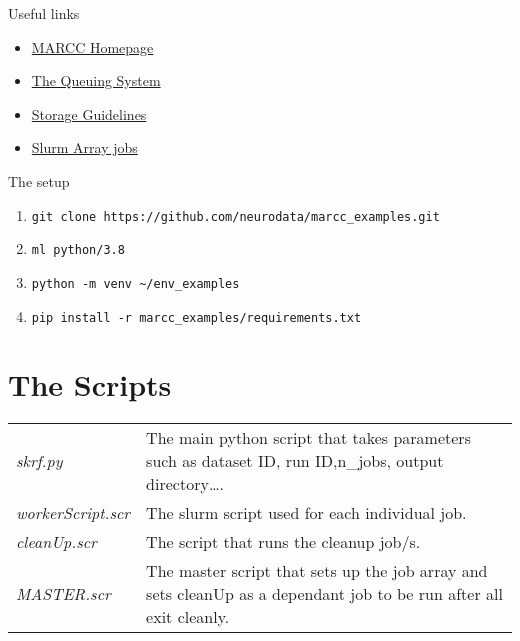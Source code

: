 \documentclass[xcolor=dvipsnames, aspectratio=169]{beamer}
\begin{document}

\begin{frame}{Useful links}
\begin{minipage}[t]{0.3\textwidth}
    \begin{itemize}
        \item \href{https://www.marcc.jhu.edu}{MARCC Homepage}
        \item \href{https://www.marcc.jhu.edu/getting-started/running-jobs/}{The Queuing System}
        \item \href{https://www.marcc.jhu.edu/troubleshoot/storage-guidelines/}{Storage Guidelines}
    \end{itemize}
\end{minipage}
\begin{minipage}[t]{0.3\textwidth}
    \begin{itemize}
        \item \href{https://slurm.schedmd.com/job_array.html}{Slurm Array jobs}
    \end{itemize}
\end{minipage}
\end{frame}

\begin{frame}[fragile]{The setup}
    \begin{enumerate}
        \item \verb;git clone https://github.com/neurodata/marcc_examples.git;
        \item \verb;ml python/3.8;
        \item \verb;python -m venv ~/env_examples;
        \item \verb;pip install -r marcc_examples/requirements.txt;
    \end{enumerate}
\end{frame}


\section{The Scripts}

\begin{frame}
    \begin{tabular}{l p{}}
\textit{skrf.py} & The main python script that takes parameters such as
dataset ID, run ID,n\_jobs, output directory\dots.\\
%
\textit{workerScript.scr} & The slurm script used for each individual job.\\
%
\textit{cleanUp.scr} & The script that runs the cleanup job/s.\\
%
\textit{MASTER.scr} & The master script that sets up the job array and
sets cleanUp as a dependant job to be run after all exit cleanly.\\
    \end{tabular}
\end{frame}
\end{document}

